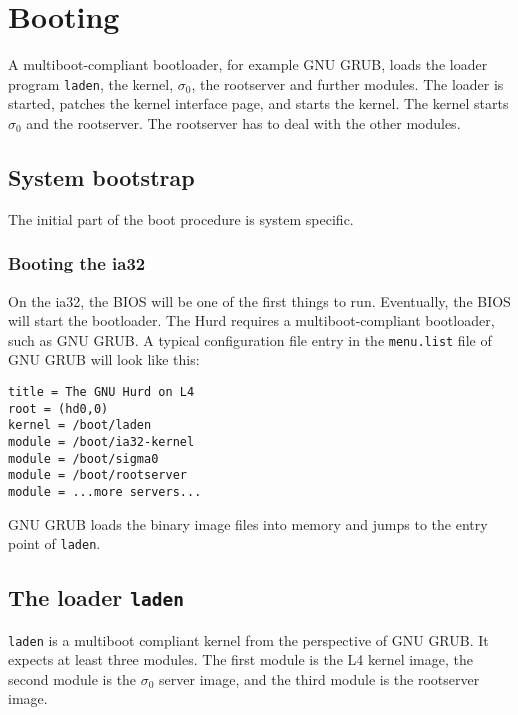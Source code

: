 \chapter{Booting}

A multiboot-compliant bootloader, for example GNU GRUB, loads the
loader program \texttt{laden}, the kernel, $\sigma_0$, the rootserver
and further modules.  The loader is started, patches the kernel
interface page, and starts the kernel.  The kernel starts $\sigma_0$
and the rootserver.  The rootserver has to deal with the other
modules.


\section{System bootstrap}

The initial part of the boot procedure is system specific.


\subsection{Booting the ia32}

On the ia32, the BIOS will be one of the first things to run.
Eventually, the BIOS will start the bootloader.  The Hurd requires a
multiboot-compliant bootloader, such as GNU GRUB.  A typical
configuration file entry in the \verb/menu.list/ file of GNU GRUB will
look like this:

\begin{verbatim}
title = The GNU Hurd on L4
root = (hd0,0)
kernel = /boot/laden
module = /boot/ia32-kernel
module = /boot/sigma0
module = /boot/rootserver
module = ...more servers...
\end{verbatim}

\begin{comment}
  The name of the rootserver and the further modules are not specified
  yet.
\end{comment}

GNU GRUB loads the binary image files into memory and jumps to the
entry point of \texttt{laden}.


\section{The loader \texttt{laden}}

\texttt{laden} is a multiboot compliant kernel from the perspective of
GNU GRUB.  It expects at least three modules.  The first module is the
L4 kernel image, the second module is the $\sigma_0$ server image, and
the third module is the rootserver image.

